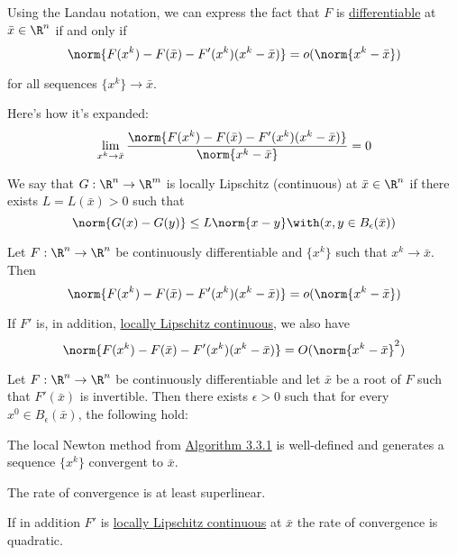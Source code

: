 
\label{b4ee31d}

Using the Landau notation, we can express the fact that $F$ is
\href{c62315d}{differentiable} at $\bar x\in\R^n$ if and only if
$$
  \norm{F(x^k)-F(\bar x)-F'(x^k)(x^k-\bar x)}=o(\norm{x^{k}-\bar x})
$$

for all sequences $\{x^k\}\to\bar x$.

Here's how it's expanded:
$$
  \lim_{x^k\to\bar x}\frac{\norm{F(x^k)-F(\bar x)-F'(x^k)(x^k-\bar x)}}{\norm{x^k-\bar x}}=0
$$

\label{ba65fa0}

We say that $G:\R^n\to\R^m$ is locally Lipschitz (continuous) at $\bar
x\in\R^n$ if there exists $L=L(\bar x)>0$ such that
$$
  \norm{G(x)-G(y)}\leq L\norm{x-y}\with(x,y\in B_\epsilon(\bar x))
$$

\label{a71a60e}

Let $F:\R^n\to\R^n$ be continuously differentiable and $\{x^k\}$ such that
$x^k\to\bar x$. Then
$$
  \norm{F(x^k)-F(\bar x)-F'(x^k)(x^k-\bar x)}=o(\norm{x^{k}-\bar x})
$$

If $F'$ is, in addition, \href{ba65fa0}{locally Lipschitz continuous}, we also
have
$$
  \norm{F(x^k)-F(\bar x)-F'(x^k)(x^k-\bar x)}=O(\norm{x^{k}-\bar x}^2)
$$

\label{fc03f3f}

Let $F:\R^n\to\R^n$ be continuously differentiable and let $\bar x$ be a root
of $F$ such that $F'(\bar x)$ is invertible. Then there exists $\epsilon>0$
such that for every $x^0\in B_\epsilon(\bar x)$, the following hold:
\begin{enumerata}
  \item The local Newton method from \href{abbc9be}{Algorithm 3.3.1} is well-defined
  and generates a sequence $\{x^k\}$ convergent to $\bar x$.
  \item The rate of convergence is at least superlinear.
  \item If in addition $F'$ is \href{ba65fa0}{locally Lipschitz continuous} at $\bar x$
  the rate of convergence is quadratic.
\end{enumerata}

\label{f2a142c}

